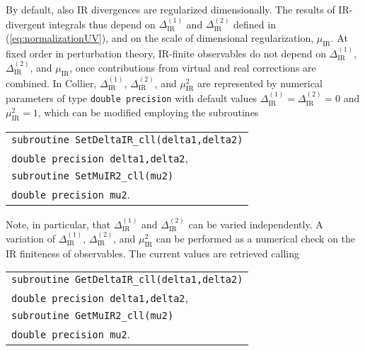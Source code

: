 \documentclass[preprint,sort&compress,12pt]{elsarticle}
\makeatletter
\def\bce{\begin{center}}
\def\ece{\end{center}}
\def\refeq#1{\mbox{(\ref{#1})}}
\newcommand{\IR}{{\mathrm{IR}}}
\newcommand{\collier}{{\sc Collier}}
\newlength{\parwidth}\newlength{\colonewidth}%
\newcommand{\cpcsub}[1]
{%
\setlength{\parwidth}{\textwidth}\addtolength{\parwidth}{-2.1em}%
\bce
\begin{tabular}[t]{@{}p{\parwidth}@{}}
#1
\end{tabular}
\ece
}%
\makeatother
\begin{document}
By default, also IR divergences are regularized dimensionally. The results of IR-divergent integrals thus depend on $\Delta_{\IR}^{(1)}$ 
and $\Delta_{\IR}^{(2)}$ defined in \refeq{eq:normalizationUV}, and on the scale of dimensional regularization, $\mu_\IR$. 
At fixed order in perturbation theory, IR-finite 
observables do not depend on $\Delta_{\IR}^{(1)}$, $\Delta_{\IR}^{(2)}$, and $\mu_\IR$,
once contributions from virtual and real corrections are combined. In {\collier}, $\Delta_{\IR}^{(1)}$, $\Delta_{\IR}^{(2)}$, and $\mu_\IR^2$
are represented by numerical parameters of type {\tt double precision} 
with default values $\Delta_{\IR}^{(1)}=\Delta_{\IR}^{(2)}=0$ and $\mu_\IR^2=1$,
which can be modified employing the subroutines
\cpcsub{
{\tt subroutine  SetDeltaIR\_cll(delta1,delta2)}\\
{\tt double precision delta1,delta2}\;, \\
{\tt subroutine  SetMuIR2\_cll(mu2)}\\
{\tt double precision mu2}\;. \\
} 
Note, in particular, that $\Delta_{\IR}^{(1)}$ and $\Delta_{\IR}^{(2)}$ 
can be varied independently.  A variation of $\Delta_{\IR}^{(1)}$,
$\Delta_{\IR}^{(2)}$, and $\mu_\IR^2$ can be performed as a
numerical check on the
IR finiteness of observables. 
The current values are retrieved calling
\cpcsub{
{\tt subroutine  GetDeltaIR\_cll(delta1,delta2)}\\
{\tt double precision delta1,delta2}\;, \\
{\tt subroutine  GetMuIR2\_cll(mu2)}\\
{\tt double precision mu2}\;. \\
} 
\end{document}
